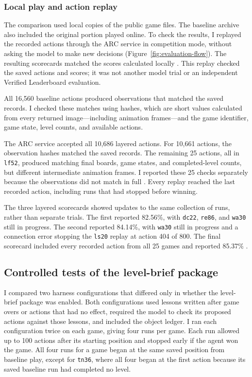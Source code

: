 \subsubsection{Local play and action replay}
The comparison used local copies of the public game files. The baseline archive also included the original portion played online. To check the results, I replayed the recorded actions through the ARC service in competition mode, without asking the model to make new decisions (Figure~\ref{fig:evaluation-flow}). The resulting scorecards matched the scores calculated locally \citep{dai2026baselinefinalcard,dai2026finalmanifest}. This replay checked the saved actions and scores; it was not another model trial or an independent Verified Leaderboard evaluation.

All 16,560 baseline actions produced observations that matched the saved records. I checked these matches using hashes, which are short values calculated from every returned image---including animation frames---and the game identifier, game state, level counts, and available actions.

The ARC service accepted all 10,686 layered actions. For 10,661 actions, the observation hashes matched the saved records. The remaining 25 actions, all in \texttt{lf52}, produced matching final boards, game states, and completed-level counts, but different intermediate animation frames. I reported these 25 checks separately because the observations did not match in full \citep{dai2026finalmanifest,dai2026replaycorrection}. Every replay reached the last recorded action, including runs that had stopped before winning.

The three layered scorecards showed updates to the same collection of runs, rather than separate trials. The first reported 82.56\%, with \texttt{dc22}, \texttt{re86}, and \texttt{wa30} still in progress. The second reported 84.14\%, with \texttt{wa30} still in progress and a connection error stopping the \texttt{ls20} replay at action 404 of 800. The final scorecard included every recorded action from all 25 games and reported 85.37\% \citep{scorecard2026layers,scorecard2026layerssecond,scorecard2026finalreplay}.


\FloatBarrier

\subsection{Controlled tests of the level-brief package}\label{sec:brief-design}
I compared two harness configurations that differed only in whether the level-brief package was enabled. Both configurations used lessons written after game overs or actions that had no effect, required the model to check its proposed actions against those lessons, and included the object ledger. I ran each configuration twice on each game, giving four runs per game. Each run allowed up to 100 actions after its starting position and stopped early if the agent won the game. All four runs for a game began at the same saved position from baseline play, except for \texttt{tn36}, where all four began at the first action because its saved baseline run had completed no level.

